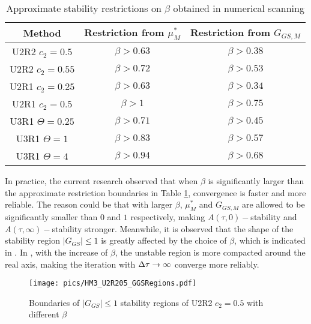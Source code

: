 \begin{table}[htbp]
    \centering
    \begin{tabular}{|c|c|c|}
        \hline
        Method             & Restriction from $\mu^*_{M}$ & Restriction from $G_{GS,M}$ \\
        \hline
        U2R2 $c_2=0.5$     & $\beta > 0.63$               & $\beta > 0.38$              \\
        \hline
        U2R2 $c_2=0.55$    & $\beta > 0.72$               & $\beta > 0.53$              \\
        \hline
        U2R1 $c_2=0.25$    & $\beta > 0.63$               & $\beta > 0.34$              \\
        \hline
        U2R1 $c_2=0.5$     & $\beta > 1$                  & $\beta > 0.75$              \\
        \hline
        U3R1 $\Theta=0.25$ & $\beta > 0.71$               & $\beta > 0.45$              \\
        \hline
        U3R1 $\Theta=1$    & $\beta > 0.83$               & $\beta > 0.57$              \\
        \hline
        U3R1 $\Theta=4$    & $\beta > 0.94$               & $\beta > 0.68$              \\
        \hline
    \end{tabular}
    \caption{Approximate stability restrictions on $\beta$ obtained in numerical scanning}
    \label{tab:resrictionBetaSearch}
\end{table}

In practice, the current research observed that
when $\beta$ is significantly larger than the approximate
restriction boundaries in Table \ref{tab:resrictionBetaSearch},
convergence is faster and more reliable.
The reason could be that with larger $\beta$, $\mu^*_M$  and $G_{GS,M}$
are allowed to be significantly smaller than $0$ and $1$ respectively,
making $A(\tau,0)-$stability and
$A(\tau,\infty)-$stability stronger.
Meanwhile, it is observed that the shape of the stability region
$|G_{GS}|\leq1$ is greatly affected by the choice of $\beta$,
which is indicated in .
In , with the
increase of $\beta$, the unstable region is more
compacted around the real axis, making the iteration with ${\Delta}\tau\rightarrow\infty$
converge more reliably.
\begin{figure}[htbp]
    \centering
    \texttt{[image: pics/HM3\_U2R205\_GGSRegions.pdf]}
    \caption[]{Boundaries of $|G_{GS}|\leq1$ stability regions of U2R2 $c_2=0.5$ with different $\beta$}
    \label{fig:HM3_U2R205_GGSRegions}
\end{figure}

